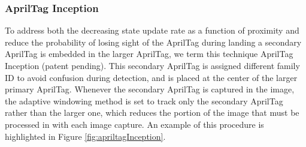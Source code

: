 \documentclass[11pt, twocolumn]{article}
\begin{document}
\subsubsection{AprilTag Inception}
To address both the decreasing state update rate as a function of proximity and reduce the probability of losing sight of the AprilTag during landing a secondary AprilTag is embedded in the larger AprilTag, we term this technique AprilTag Inception (patent pending). This secondary AprilTag is assigned different family ID to avoid confusion during detection, and is placed at the center of the larger primary AprilTag. Whenever the secondary AprilTag is captured in the image, the adaptive windowing method is set to track only the secondary AprilTag rather than the larger one, which reduces the portion of the image that must be processed in with each image capture. An example of this procedure is highlighted in Figure \ref{fig:apriltagInception}.
 
\end{document}
